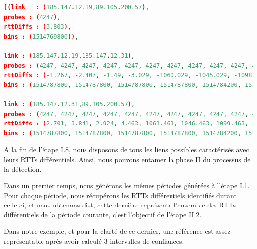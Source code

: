 \begin{lstlisting}[language=json,firstnumber=1, caption={Illustration de l'ordre des liens}, basicstyle = \footnotesize]
[(link   : (185.147.12.19,89.105.200.57), 
probes : (4247), 
rttDiffs : (3.803), 
bins : (1514769800)),  

link : (185.147.12.19,185.147.12.31), 
probes : (4247, 4247, 4247, 4247, 4247, 4247, 4247, 4247, 4247, 4247, 4247, 4247, 4247, 4247, 4247, 4247, 4247, 4247, 4247, 4247, 4247, 4247, 4247, 4247), 
rttDiffs : (-1.267, -2.407, -1.49, -3.029, -1060.029, -1045.029, -1098.029, -1080.029, -680.029, -845.029, -998.029, -800.029, -1.029, -2.029, -1.557, -3.197, -1.277, -2.017, -1.257, -2.968, -0.96, -1.967, -0.987, -3.201), 
bins : (1514787800, 1514787800, 1514787800, 1514787800, 1514784200, 1514784200, 1514784200, 1514784200, 1514780600, 1514780600, 1514780600, 1514780600, 1514769800, 1514769800, 1514769800, 1514769800, 1514773400, 1514773400, 1514773400, 1514773400, 1514777000, 1514777000, 1514777000, 1514777000)),  

link : (185.147.12.31,89.105.200.57),
probes : (4247, 4247, 4247, 4247, 4247, 4247, 4247, 4247, 4247, 4247, 4247, 4247, 4247, 4247, 4247, 4247, 4247, 4247, 4247, 4247, 4247, 4247, 4247, 4247, 4247),
rttDiffs : (2.701, 3.841, 2.924, 4.463, 1061.463, 1046.463, 1099.463, 1081.463, 681.463, 846.463, 999.463, 801.463, 2.463, 3.463, 2.991, 4.631, -7.75, 2.711, 3.451, 2.691, 4.402, 2.394, 3.401, 2.421, 4.635),
bins : (1514787800, 1514787800, 1514787800, 1514787800, 1514784200, 1514784200, 1514784200, 1514784200, 1514780600, 1514780600, 1514780600, 1514780600, 1514769800, 1514769800, 1514769800, 1514769800, 1514769800, 1514773400, 1514773400, 1514773400, 1514773400, 1514777000, 1514777000, 1514777000, 1514777000))]
\end{lstlisting}


A la fin de l'étape I.8, nous disposons de tous les liens possibles caractérisés avec leurs RTTs différentiels. Ainsi, nous pouvons entamer la phase II du processus de la détection.

Dans un premier temps, nous générons les mêmes  périodes générées à  l'étape I.1. Pour chaque période,  nous récupérons les RTTs différentiels identifiés durant celle-ci, et nous obtenons {\color{gray} dist}, cette dernière représente l'ensemble des RTTs différentiels de la période courante, c'est l'objectif de l'étape II.2.

Dans notre exemple,  et pour la clarté de ce dernier, une référence est assez représentable après avoir calculé 3 intervalles de confiances.  

